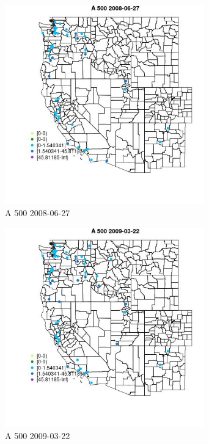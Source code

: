 \begin{figure} 
\centering  
\includegraphics[width=0.77\textwidth]{Code_Outputs/Report_ML_input_PM25_Step4_part_e_de_duplicated_aves_MapObsA_5002008-06-27.jpg} 
\caption{\label{fig:Report_ML_input_PM25_Step4_part_e_de_duplicated_avesMapObsA_5002008-06-27}A 500 2008-06-27} 
\end{figure} 
 

\begin{figure} 
\centering  
\includegraphics[width=0.77\textwidth]{Code_Outputs/Report_ML_input_PM25_Step4_part_e_de_duplicated_aves_MapObsA_5002009-03-22.jpg} 
\caption{\label{fig:Report_ML_input_PM25_Step4_part_e_de_duplicated_avesMapObsA_5002009-03-22}A 500 2009-03-22} 
\end{figure} 
 


